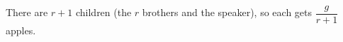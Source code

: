 There are $r+1$ children (the $r$ brothers and the speaker), so each gets $\boxed{\dfrac{g}{r+1}}$ apples.
